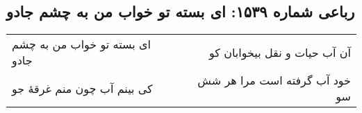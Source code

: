 \begin{center}
\section*{رباعی شماره ۱۵۳۹: ای بسته تو خواب من به چشم جادو}
\label{sec:1539}
\begin{longtable}{l p{0.5cm} r}
ای بسته تو خواب من به چشم جادو
&&
آن آب حیات و نقل بیخوابان کو
\\
کی بینم آب چون منم غرقهٔ جو
&&
خود آب گرفته است مرا هر شش سو
\\
\end{longtable}
\end{center}
